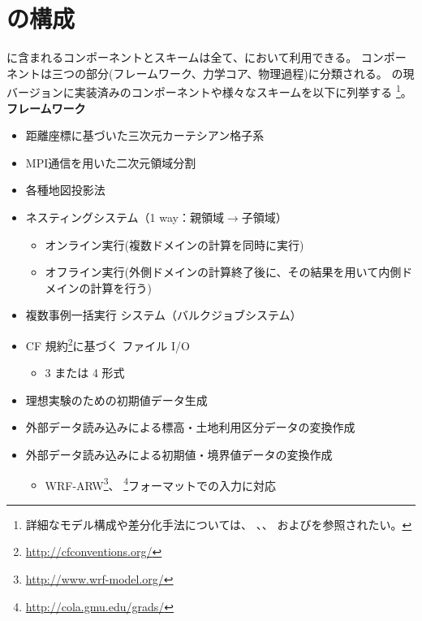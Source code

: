 \section{\scalerm の構成}  \label{subsec:sturcture_scale_rm}
\scalelib に含まれるコンポーネントとスキームは全て、\scalerm において利用できる。
コンポーネントは三つの部分(フレームワーク、力学コア、物理過程)に分類される。
\scalerm の現バージョンに実装済みのコンポーネントや様々なスキームを以下に列挙する%
\footnote{
詳細なモデル構成や差分化手法については、
\citet{scale_2015}、\citet{satoy_2015b}、
および\citet{nishizawa_2015}を参照されたい。
}。
\\

{\bf フレームワーク}
\begin{itemize}
 \item 距離座標に基づいた三次元カーテシアン格子系
 \item MPI通信を用いた二次元領域分割
 \item 各種地図投影法
 \item ネスティングシステム（1 way：親領域$\to$子領域）
   \begin{itemize}
    \item オンライン実行(複数ドメインの計算を同時に実行)
    \item オフライン実行(外側ドメインの計算終了後に、その結果を用いて内側ドメインの計算を行う)
   \end{itemize}
 \item 複数事例一括実行 システム（バルクジョブシステム）
 \item CF 規約\footnote{\url{http://cfconventions.org/}}に基づく \netcdf ファイル I/O
   \begin{itemize}
   \item {\netcdf}3 または {\netcdf}4 形式
   \end{itemize}
 \item 理想実験のための初期値データ生成
 \item 外部データ読み込みによる標高・土地利用区分データの変換作成
 \item 外部データ読み込みによる初期値・境界値データの変換作成
   \begin{itemize}
    \item
      WRF-ARW\footnote{\url{http://www.wrf-model.org/}}、
      \grads \footnote{\url{http://cola.gmu.edu/grads/}}フォーマットでの入力に対応
   \end{itemize}
\end{itemize}

